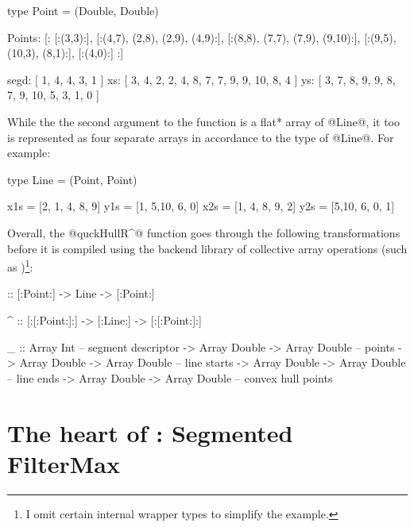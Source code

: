 \documentclass[preamble.tex]{subfiles}
\begin{document}
\begin{hscode}
type Point = (Double, Double)

Points:
  [:
     [:(3,3):],
     [:(4,7), (2,8),  (2,9), (4,9):],
     [:(8,8), (7,7),  (7,9), (9,10):],
     [:(9,5), (10,3), (8,1):],
     [:(4,0):]
  :]


segd: [ 1, 4, 4, 3, 1 ]
xs:   [ 3, 4, 2, 2, 4, 8, 7, 7,  9, 9, 10, 8, 4 ]
ys:   [ 3, 7, 8, 9, 9, 8, 7, 9, 10, 5,  3, 1, 0 ]
\end{hscode}


While the the second argument to the function is a \*flat* array of @Line@, it too is represented as four separate arrays in accordance to the type of @Line@. For example:


\begin{hscode}
type Line = (Point, Point)

x1s = [2, 1, 4, 8, 9]
y1s = [1, 5,10, 6, 0]
x2s = [1, 4, 8, 9, 2]
y2s = [5,10, 6, 0, 1]
\end{hscode}


Overall, the @quckHullR^@ function goes through the following transformations before it is compiled using the backend library of collective array operations (such as \LiveFusion)\footnote{I omit certain internal wrapper types to simplify the example.}:

\begin{hscode}[literate={^}{{$^\uparrow$}}1,]
\QuickHullR  :: [:Point:] -> Line -> [:Point:]


\QuickHullR^ :: [:[:Point:]:] -> [:Line:] -> [:[:Point:]:]


\QuickHullR_ :: Array Int                      -- segment descriptor
            -> Array Double -> Array Double   -- points
            -> Array Double -> Array Double   -- line starts
            -> Array Double -> Array Double   -- line ends            
            -> Array Double -> Array Double   -- convex hull points
\end{hscode}



\section{The heart of \QuickHull: Segmented FilterMax}
\label{sec:FilterMax}
\end{document}
